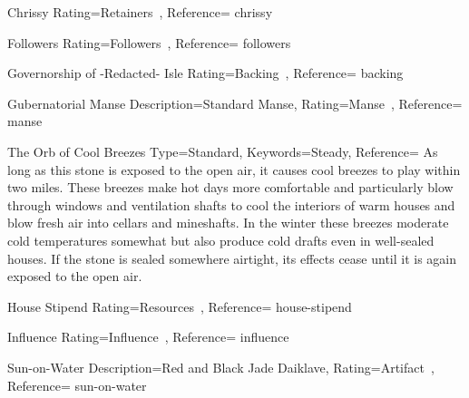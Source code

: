 ﻿


\begin{Merit}{Chrissy}{%
    Rating=Retainers~,
    Reference=\cite*[p.~164]{ex3}
}{chrissy}
    \TBW
\end{Merit}


\begin{Merit}{Followers}{%
    Rating=Followers~,
    Reference=\cite*[p.~161]{ex3}
}{followers}
    \TBW
\end{Merit}


\begin{Merit}{Governorship of -Redacted- Isle}{%
    Rating=Backing~,
    Reference=\cite*[p.~159]{ex3}
}{backing}
    \TBW
\end{Merit}


\begin{Merit}{Gubernatorial Manse}{%
    Description={Standard Manse},
    Rating=Manse~,
    Reference=\cite*[p.~163]{ex3}
}{manse}
    \TBW

    \begin{Hearthstone}{The Orb of Cool Breezes}{%
        Type=Standard,
        Keywords=Steady,
        Reference=\cite*[p.~604]{ex3}
    }
        As long as this stone is exposed to the open air, it causes cool
        breezes to play within two miles. These breezes make hot days more
        comfortable and particularly blow through windows and ventilation
        shafts to cool the interiors of warm houses and blow fresh air into
        cellars and mineshafts. In the winter these breezes moderate cold
        temperatures somewhat but also produce cold drafts even in
        well-sealed houses. If the stone is sealed somewhere airtight, its
        effects cease until it is again exposed to the open air.
    \end{Hearthstone}
\end{Merit}


\begin{Merit}{House Stipend}{%
    Rating=Resources~,
    Reference=\cite*[p.~164]{ex3}
}{house-stipend}
    \TBW
\end{Merit}


\begin{Merit}{Influence}{%
    Rating=Influence~,
    Reference=\cite*[p.~162]{ex3}
}{influence}
    \TBW
\end{Merit}


\begin{Merit}{Sun-on-Water}{%
    Description={Red and Black Jade Daiklave},
    Rating=Artifact~,
    Reference=\cite*[p.~159]{ex3}
}{sun-on-water}
    \TBW


\end{Merit}


\printbibliography[title=References]


